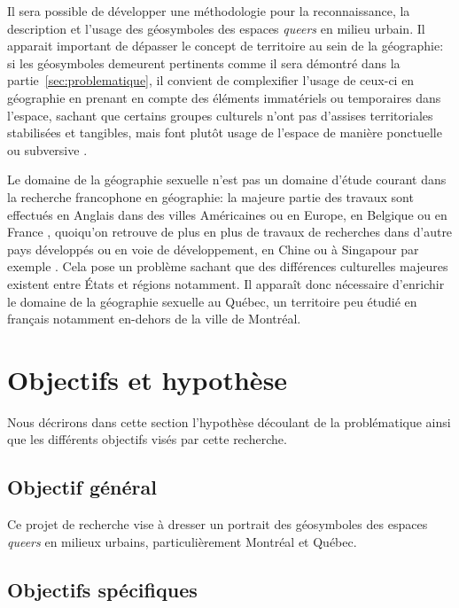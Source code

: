 Il sera possible de développer une méthodologie pour la reconnaissance, la description et l'usage des géosymboles des espaces \emph{queers} en milieu urbain.
Il apparait important de dépasser le concept de territoire au sein de la
géographie: si les géosymboles demeurent pertinents comme il sera démontré dans la partie~\ref{sec:problematique}, il convient de complexifier l'usage de ceux-ci en géographie en prenant en compte des éléments immatériels ou temporaires dans l'espace, sachant que certains groupes culturels n'ont pas d'assises territoriales stabilisées et tangibles, mais font plutôt usage de l'espace de manière ponctuelle ou subversive \parencite{Talburt2012}.

Le domaine de la géographie sexuelle n'est pas un domaine d'étude courant dans
la recherche francophone en géographie: la majeure partie des travaux sont effectués en Anglais dans des villes Américaines ou en Europe, en Belgique ou en France \parencite{Blidon2010,Blidon2006,Cattan2010,Deligne2006}, quoiqu'on retrouve de plus en plus de travaux de recherches dans d'autre pays développés ou en voie de développement, en Chine ou à Singapour par exemple \parencite{Oswin2014a,Kong2012}.
Cela pose un problème sachant que des différences culturelles majeures existent entre États et régions notamment. 
Il apparaît donc nécessaire d'enrichir le domaine de la géographie sexuelle au Québec, un territoire peu étudié en français notamment en-dehors de la ville de Montréal.


\section*{Objectifs et hypothèse} %
\label{sec:objectifs_et_hypotheses}
Nous décrirons dans cette section l'hypothèse découlant de la problématique ainsi que les différents objectifs visés par cette recherche.


\subsection*{Objectif général} %
\label{sub:objectif_general}
Ce projet de recherche vise à dresser un portrait des géosymboles des espaces \emph{queers} en milieux urbains, particulièrement Montréal et Québec.

\subsection*{Objectifs spécifiques} %
\label{sub:objectifs_specifiques}

